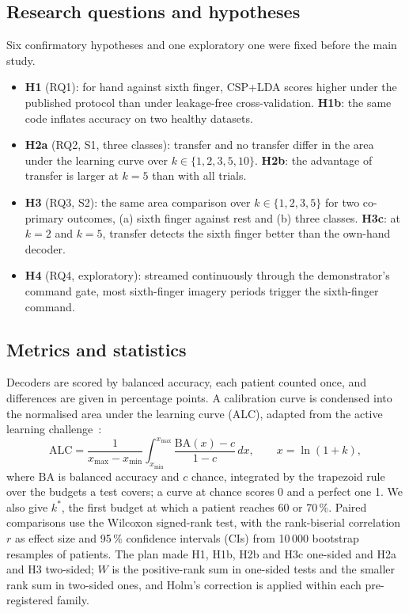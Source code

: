 \subsection{Research questions and hypotheses}
\label{sec:hyp}
Six confirmatory hypotheses and one exploratory one were fixed before the main study.
\begin{itemize}
  \item \textbf{H1} (RQ1): for hand against sixth finger, CSP+LDA scores higher under the
        published protocol than under leakage-free cross-validation. \textbf{H1b}: the same
        code inflates accuracy on two healthy datasets.
  \item \textbf{H2a} (RQ2, S1, three classes): transfer and no transfer differ in the area under
        the learning curve over $k \in \{1, 2, 3, 5, 10\}$. \textbf{H2b}: the advantage of
        transfer is larger at $k = 5$ than with all trials.
  \item \textbf{H3} (RQ3, S2): the same area comparison over $k \in \{1, 2, 3, 5\}$ for two
        co-primary outcomes, (a) sixth finger against rest and (b) three classes.
        \textbf{H3c}: at $k = 2$ and $k = 5$, transfer detects the sixth finger better than the
        own-hand decoder.
  \item \textbf{H4} (RQ4, exploratory): streamed continuously through the demonstrator's command
        gate, most sixth-finger imagery periods trigger the sixth-finger command.
\end{itemize}

\subsection{Metrics and statistics}
Decoders are scored by balanced accuracy, each patient counted once, and differences are given
in percentage points. A calibration curve is condensed into the normalised area under the
learning curve (ALC), adapted from the active learning challenge~\cite{guyon2011}:
\begin{equation}
\mathrm{ALC} = \frac{1}{x_{\max} - x_{\min}} \int_{x_{\min}}^{x_{\max}}
\frac{\mathrm{BA}(x) - c}{1 - c}\, dx, \qquad x = \ln(1 + k),
\label{eq:alc}
\end{equation}
where $\mathrm{BA}$ is balanced accuracy and $c$ chance, integrated by the trapezoid rule over
the budgets a test covers; a curve at chance scores 0 and a perfect one 1. We also give $k^*$,
the first budget at which a patient reaches 60 or 70\,\%. Paired comparisons use the Wilcoxon
signed-rank test, with the rank-biserial correlation $r$ as effect size and 95\,\% confidence
intervals (CIs) from 10\,000 bootstrap resamples of patients. The plan made H1, H1b, H2b and H3c
one-sided and H2a and H3 two-sided; $W$ is the positive-rank sum in one-sided tests and the
smaller rank sum in two-sided ones, and Holm's correction is applied within each pre-registered
family.

